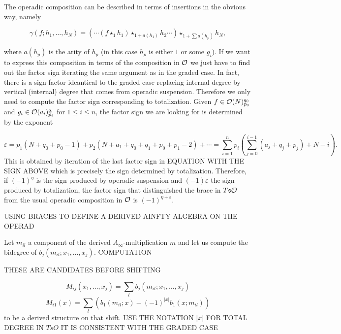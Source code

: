\documentclass[twoside]{article}
\begin{document}
The operadic composition can be described in terms of insertions in the obvious way, namely 

$$\gamma(f;h_1,\dots, h_N)=(\cdots(f\star_1 h_1)\star_{1+a(h_1)}h_2\cdots)\star_{1+\sum a(h_p)}h_N,$$

where $a(h_p)$ is the arity of $h_p$ (in this case $h_p$ is either $1$ or some $g_i$). If we want to express this composition in terms of the composition in ${\mathcal O}$ we just have to find out the factor sign iterating the same argument as in the graded case. In fact, there is a sign factor ideantical to the graded case replacing internal degree by vertical (internal) degree that comes from operadic suspension. Therefore we only need to compute the factor sign corresponding to totalization. Given $f\in {\mathcal O}(N)^{q_0}_{p_0}$ and  $g_i\in{\mathcal O}(a_i)^{q_i}_{p_i}$ for $1\leq i\leq n$, the factor sign we are looking for is determined by the exponent

\[\varepsilon=p_1(N+q_0+p_0-1)+p_2(N+a_1+q_0+q_1+p_0+p_1-2)+\cdots=\sum_{i=1}^np_i(\sum_{j=0}^{i-1}(a_j+q_j+p_j)+N-i).\]
This is obtained by iteration of the last factor sign in EQUATION WITH THE SIGN ABOVE which is precisely the sign determined by totalization. Therefore, if $(-1)^\eta$ is the sign produced by operadic suspension and $(-1)\varepsilon$ the sign produced by totalization, the factor sign that distinguished the brace in $T\mathfrak{s}{\mathcal O}$ from the usual operadic composition in ${\mathcal O}$ is $(-1)^{\eta+\varepsilon}$.

 USING BRACES TO DEFINE A DERIVED AINFTY ALGEBRA ON THE OPERAD

Let $m_{il}$ a component of the derived $A_\infty$-multiplication $m$ and let us compute the bidegree of $b_j(m_{il};x_1,\dots, x_j)$. COMPUTATION

THESE ARE CANDIDATES BEFORE SHIFTING 

\[M_{ij}(x_1,\dots, x_j)=\sum_l b_j(m_{il};x_1,\dots, x_j)\]
\[M_{i1}(x)= \sum_l (b_1(m_{il};x)-(-1)^{|x|}b_1(x;m_{il}))\]
to be a derived structure on that shift. USE THE NOTATION $|x|$ FOR TOTAL DEGREE IN $TsO$ IT IS CONSISTENT WITH THE GRADED CASE
\end{document}
